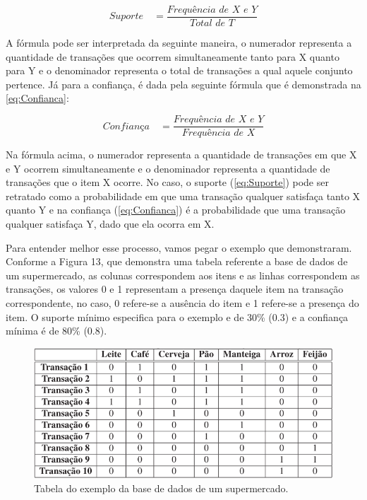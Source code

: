 \begin{equation}
    \label{eq:Suporte}
        {\textit{Suporte}\quad =\frac { \textit{Frequência de X e Y} }{ \textit{Total de T}} }
\end{equation}

\par
A fórmula pode ser interpretada da seguinte maneira, o numerador representa a quantidade de transações que ocorrem simultaneamente tanto para X quanto para Y e o denominador representa o total de transações a qual aquele conjunto pertence. Já para a confiança, é dada pela seguinte fórmula que é demonstrada na \autoref{eq:Confianca}:

\begin{equation}
    \label{eq:Confianca}
        {\textit{Confiança}\quad =\frac { \textit{Frequência de X e Y} }{ \textit{Frequência de X}} }
\end{equation}

\par
Na fórmula acima, o numerador representa a quantidade de transações em que X e Y ocorrem simultaneamente e o denominador representa a quantidade de transações que o item X ocorre. No caso, o suporte (\autoref{eq:Suporte}) pode ser retratado como a probabilidade em que uma transação qualquer satisfaça tanto X quanto Y e na confiança (\autoref{eq:Confianca}) é a probabilidade que uma transação qualquer satisfaça Y, dado que ela ocorra em X.

\par
Para entender melhor esse processo, vamos pegar o exemplo que  demonstraram. Conforme a Figura 13, que demonstra uma tabela referente a base de dados de um supermercado, as colunas correspondem aos itens e as linhas correspondem as transações, os valores 0 e 1 representam a presença daquele item na transação correspondente, no caso, 0 refere-se a ausência do item e 1 refere-se a presença do item. O suporte mínimo especifica para o exemplo e de 30\% (0.3) e a confiança mínima é de 80\% (0.8).


\begin{figure}[!htp]
	\begin{center}
    \caption{\label{fig:waveform_fig} Tabela do exemplo da base de dados de um supermercado.}
	\includegraphics[scale=0.80]{Figuras/Tabela_da_base_de_supermercado.png}
	\end{center}
\end{figure}

